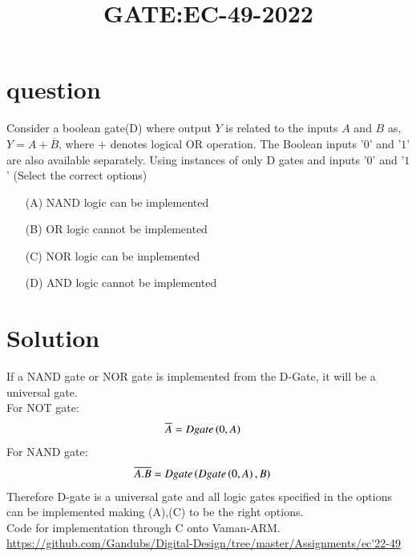 \documentclass[journal,12pt,onecolumn]{IEEEtran}
\theoremstyle{remark}
\begin{document}

\vspace{3cm}

\title{GATE:EC-49-2022}
\maketitle
\bigskip



\section{question}
Consider a boolean gate(D) where output $Y$ is related to the inputs $A$ and $B$ as, $Y = A + \overline{B}$, where $+$ denotes logical OR operation. The Boolean inputs '$0$' and '$1$' are also available separately. Using instances of only D gates and inputs '$0$' and '$1$' (Select the correct options)
\begin{enumerate}
    \item [(A)] NAND logic can be implemented
    \item [(B)] OR logic cannot be implemented 
    \item [(C)] NOR logic can be implemented
    \item [(D)] AND logic cannot be implemented
\end{enumerate}

\section{Solution}
If a NAND gate or NOR gate is implemented from the D-Gate, it will be a universal gate.\\
For NOT gate:
\begin{align}
    \overline{A} &= Dgate\left(0,A\right)
\end{align}
For NAND gate:
\begin{align}
    \overline{A.B} &= Dgate\left(Dgate\left(0,A\right),B\right)
\end{align}
Therefore D-gate is a universal gate and all logic gates specified in the options can be implemented making (A),(C) to be the right options.\\
Code for implementation through C onto Vaman-ARM.\\
\url{https://github.com/Gandubs/Digital-Design/tree/master/Assignments/ec'22-49}
 
\end{document}
